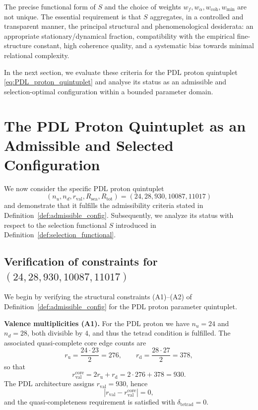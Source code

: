 \documentclass[11pt,a4paper]{article}
\theoremstyle{definition}
\begin{document}
The precise functional form of $S$ and the choice of weights $w_f, w_{\alpha}, w_{\mathrm{coh}}, w_{\mathrm{min}}$ are not unique.\cite{Combinatorial_Proton_v2_2026,PDL_Global_Mapping_2026} The essential requirement is that $S$ aggregates, in a controlled and transparent manner, the principal structural and phenomenological desiderata: an appropriate stationary/dynamical fraction, compatibility with the empirical fine-structure constant, high coherence quality, and a systematic bias towards minimal relational complexity.

In the next section, we evaluate these criteria for the PDL proton quintuplet \eqref{eq:PDL_proton_quintuplet} and analyse its status as an admissible and selection-optimal configuration within a bounded parameter domain.\cite{Combinatorial_Proton_v2_2026,Alpha_PDL_v2_2026}

\section{The PDL Proton Quintuplet as an Admissible and Selected Configuration}
\label{sec:ref_solution}

We now consider the specific PDL proton quintuplet
\[
 (n_u,n_d,r_{\mathrm{val}},R_{\mathrm{sea}},R_{\mathrm{tot}}) = (24,28,930,10087,11017)
\]
and demonstrate that it fulfills the admissibility criteria stated in Definition~\ref{def:admissible_config}. Subsequently, we analyze its status with respect to the selection functional $S$ introduced in Definition~\ref{def:selection_functional}.\cite{Combinatorial_Proton_v2_2026,PDL_Global_Mapping_2026}

\subsection{Verification of constraints for \texorpdfstring{$(24,28,930,10087,11017)$}{(24,28,930,10087,11017)}}

We begin by verifying the structural constraints (A1)–(A2) of Definition~\ref{def:admissible_config} for the PDL proton parameter quintuplet.

\medskip
\noindent\textbf{Valence multiplicities (A1).} For the PDL proton we have $n_u=24$ and $n_d=28$, both divisible by $4$, and thus the tetrad condition is fulfilled.\cite{Combinatorial_Proton_v2_2026} The associated quasi-complete core edge counts are
\[
 r_{\mathrm{u}} = \frac{24\cdot 23}{2} = 276, \qquad
 r_{\mathrm{d}} = \frac{28\cdot 27}{2} = 378,
\]
so that
\[
 r_{\mathrm{val}}^{\mathrm{core}} = 2r_{\mathrm{u}} + r_{\mathrm{d}} = 2\cdot 276 + 378 = 930.
\]
The PDL architecture assigns $r_{\mathrm{val}}=930$, hence
\[
 \left|r_{\mathrm{val}} - r_{\mathrm{val}}^{\mathrm{core}}\right| = 0,
\]
and the quasi-completeness requirement is satisfied with $\delta_{\mathrm{tetrad}}=0$.\cite{Combinatorial_Proton_v2_2026}
\end{document}
